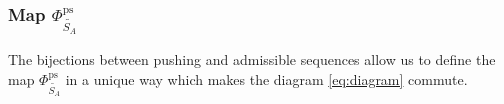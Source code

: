 \documentclass[12pt,dvips]{amsart}
\numberwithin{equation}{section} \numberwithin{figure}{section}
\theoremstyle{plain}
\newtheorem{corollary}[lemma]{Corollary}
\theoremstyle{definition}
\theoremstyle{remark}
\newcommand{\aaa}{{\mathbf{a}}}
\newcommand{\ppp}{{\mathbf{p}}}
\newcommand{\E}{{\mathbb{E}}}
\newcommand{\N}{{\mathbb{N}}}
\newcommand{\Sn}[1]{{{S}}_{#1}}
\newcommand{\xtra}{\ast}
\newcommand{\fpsas}{\Phi^{\ps}_{\adm}}
\newcommand{\fasps}{\Phi^{\adm}_{\ps}}
\newcommand{\fass}{\Phi^{\adm}_{\PartPerm{A}}}
\newcommand{\fpss}{\Phi^{\ps}_{\PartPerm{A}}}
\newcommand{\PartPerm}[1]{\widetilde{\Sn{#1}}}
\DeclareMathOperator{\adm}{as}
\DeclareMathOperator{\ps}{ps}
\begin{document}



%
%

\subsubsection{Map $\fpss$} The bijections between pushing and
admissible sequences allow us to define the map $\fpss$ in a unique
way which makes the diagram \eqref{eq:diagram} commute.
\end{document}

